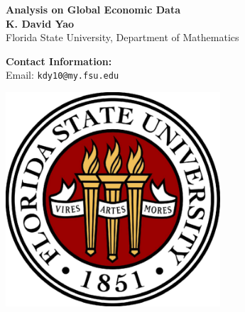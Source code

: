 \documentclass[a0,landscape]{a0poster}
\begin{document}


\begin{minipage}[b]{0.55\linewidth}
\veryHuge \color{Red} \textbf{Analysis on Global Economic Data} \color{Black}\\ %
\huge \textbf{K. David Yao }\\ %
\huge Florida State University, Department of Mathematics\\ %
\end{minipage}
%
\begin{minipage}[b]{0.25\linewidth}
 \textbf{Contact Information:}\\
Email: \texttt{kdy10@my.fsu.edu} %
\end{minipage}
%
\begin{minipage}[b]{0.19\linewidth}
\includegraphics[width=8cm]{sealfsu5.pdf} %
\end{minipage}

\vspace{1cm} %
\end{document}
